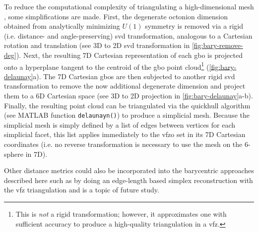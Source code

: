 \documentclass[final,twocolumn,12pt]{elsarticle}
\begin{document}
\begin{appendices}
To reduce the computational complexity of triangulating a high-dimensional mesh \cite{barberQuickhullAlgorithmConvex1996}, some simplifications are made. First, the degenerate octonion dimension obtained from analytically minimizing $U(1)$ symmetry \cite{francisGeodesicOctonionMetric2019} is removed via a rigid (i.e. distance- and angle-preserving) \gls{svd} transformation,
analogous to a Cartesian rotation and translation (see 3D to 2D \gls{svd} transformation in \cref{fig:bary-remove-deg}).
Next, the resulting 7D Cartesian representation of each \gls{gbo} is projected onto a hyperplane tangent to the centroid of the \gls{gbo} point cloud\footnote{This is \textit{not} a rigid transformation; however, it approximates one with sufficient accuracy to produce a high-quality triangulation in a \gls{vfz}.} (\cref{fig:bary-delaunay}a). The 7D Cartesian \glspl{gbo} are then subjected to another rigid \gls{svd} transformation to remove the now additional degenerate dimension and project them to a 6D Cartesian space (see 3D to 2D projection in \cref{fig:bary-delaunay}a-b). Finally, the resulting point cloud can be triangulated via the quickhull algorithm \cite{barberQuickhullAlgorithmConvex1996} (see MATLAB function \texttt{delaunayn()}) to produce a simplicial mesh. Because the simplicial mesh is simply defined by a list of edges between vertices for each simplicial facet, this list applies immediately to the \gls{vfzo} set in its 7D Cartesian coordinates (i.e. no reverse transformation is necessary to use the mesh on the 6-sphere in 7D).

Other distance metrics \cite{morawiecDistancesGrainInterfaces2019} could also be incorporated into the barycentric approaches described here such as by doing an edge-length based simplex reconstruction with the \gls{vfz} triangulation \cite{connorHighdimensionalSimplexesSupermetric2017,boissonnatOnlyDistancesAre2017} and is a topic of future study.


\end{appendices}
\end{document}
